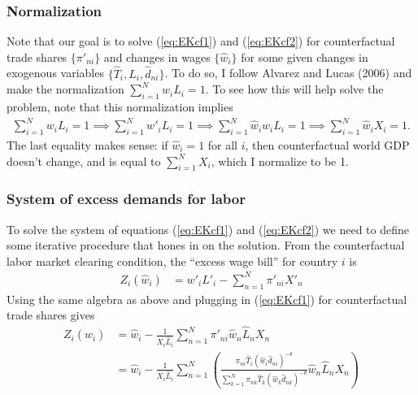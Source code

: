 \documentclass[12pt]{article}
\begin{document}
\subsubsection{Normalization}
Note that our goal is to solve (\ref{eq:EKcf1}) and (\ref{eq:EKcf2}) for counterfactual trade shares $\{\pi'_{ni}\}$ and changes in wages $\{\hat w_i\}$ for some given changes in exogenous variables $\{\hat T_i, \hat L_i, \hat d_{ni}\}$.
To do so, I follow Alvarez and Lucas (2006) and make the normalization $\sum_{i=1}^N w_iL_i = 1$. To see how this will help solve the problem, note that this normalization implies
\begin{align*}
\sum_{i=1}^N w_iL_i = 1 \implies \sum_{i=1}^N w'_iL_i = 1 \implies \sum_{i=1}^N \hat w_i w_i L_i = 1 \implies \sum_{i=1}^N \hat w_i X_i = 1.
\end{align*}
The last equality makes sense: if $\hat w_i =1$ for all $i$, then counterfactual world GDP doesn't change, and is equal to $ \sum_{i=1}^N X_i$, which I normalize to be 1.

\subsubsection{System of excess demands for labor}
To solve the system of equations (\ref{eq:EKcf1}) and (\ref{eq:EKcf2}) we need to define some iterative procedure that hones in on the solution. From the counterfactual labor market clearing condition, the ``excess wage bill'' for country $i$ is 
\begin{align*}
Z_i(\hat w_i) &= w'_i L'_i - \sum_{n=1}^N \pi'_{ni}X'_n
\end{align*}
Using the same algebra as above and plugging in (\ref{eq:EKcf1}) for counterfactual trade shares gives
\begin{align*}
Z_i(\hat w_i) &= \hat w_i - \frac{1}{X_i\hat L_i} \sum_{n=1}^N \pi'_{ni} \hat w_n \hat L_n X_n\\
&=\hat w_i - \frac{1}{X_i\hat L_i} \sum_{n=1}^N \left(\frac{\pi_{ni}\hat T_i(\hat w_i\hat d_{ni})^{-\theta}  }{\sum_{k=1}^N\pi_{nk}\hat T_k(\hat w_k \hat d_{nk})^{-\theta}}\hat w_n \hat L_n X_n \right)
\end{align*}
\end{document}
